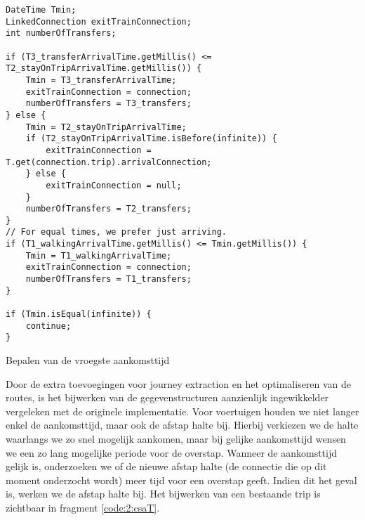 \begin{code}
\begin{verbatim}
DateTime Tmin;
LinkedConnection exitTrainConnection;
int numberOfTransfers;

if (T3_transferArrivalTime.getMillis() <= T2_stayOnTripArrivalTime.getMillis()) {
	Tmin = T3_transferArrivalTime;
	exitTrainConnection = connection;
	numberOfTransfers = T3_transfers;
} else {
	Tmin = T2_stayOnTripArrivalTime;
	if (T2_stayOnTripArrivalTime.isBefore(infinite)) {
		exitTrainConnection = T.get(connection.trip).arrivalConnection;
	} else {
		exitTrainConnection = null;
	}
	numberOfTransfers = T2_transfers;
}
// For equal times, we prefer just arriving.
if (T1_walkingArrivalTime.getMillis() <= Tmin.getMillis()) {
	Tmin = T1_walkingArrivalTime;
	exitTrainConnection = connection;
	numberOfTransfers = T1_transfers;
}

if (Tmin.isEqual(infinite)) {
	continue;
}
		\end{verbatim}
		\caption[CSA: Bepalen van vroegste aankomsttijd]{Bepalen van de vroegste aankomsttijd}
		\label{code:2:csaMin}
\end{code}
Door de extra toevoegingen voor journey extraction en het optimaliseren van de routes, is het bijwerken van de gegevenstructuren aanzienlijk ingewikkelder vergeleken met de originele implementatie. Voor voertuigen houden we niet langer enkel de aankomsttijd, maar ook de afstap halte bij. Hierbij verkiezen we de halte waarlangs we zo snel mogelijk aankomen, maar bij gelijke aankomsttijd wensen we een zo lang mogelijke periode voor de overstap. Wanneer de aankomsttijd gelijk is, onderzoeken we of de nieuwe afstap halte (de connectie die op dit moment onderzocht wordt) meer tijd voor een overstap geeft. Indien dit het geval is, werken we de afstap halte bij. Het bijwerken van een bestaande trip is zichtbaar in fragment \ref{code:2:csaT}.
